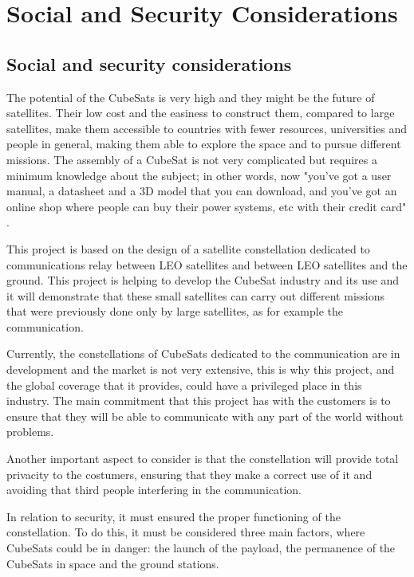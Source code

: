 \chapter{Social and Security Considerations}
\newpage
\section{Social and security considerations}

The potential of the CubeSats is very high and they might be the future of satellites. Their low cost and the easiness to construct them, compared to large satellites, make them accessible to countries with fewer resources, universities and people in general, making them able to explore the space and to pursue different missions. The assembly of a CubeSat is not very complicated but requires a minimum knowledge about the subject; in other words, now "you've got a user manual, a datasheet and a 3D model that you can download, and you've got an online shop where people can buy their power systems, etc with their credit card" \cite{CraigClark}. 

This project is based on the design of a satellite constellation dedicated to communications relay between LEO satellites and between LEO satellites and the ground. This project is helping to develop the CubeSat industry and its use and it will demonstrate that these small satellites can carry out different missions that were previously done only by large satellites, as for example the communication.

Currently, the constellations of CubeSats dedicated to the communication are in development and the market is not very extensive, this is why this project, and the global coverage that it provides, could have a privileged place in this industry. The main commitment that this project has with the customers is to ensure that they will be able to communicate with any part of the world without problems. 

Another important aspect to consider is that the constellation will provide total privacity  to the costumers, ensuring that they make a correct use of it and avoiding that third people interfering in the communication.

In relation to security, it must ensured the proper functioning of the constellation. To do this, it must be considered three main factors, where CubeSats could be in danger: the launch of the payload, the permanence of the CubeSats in space and the ground stations.

